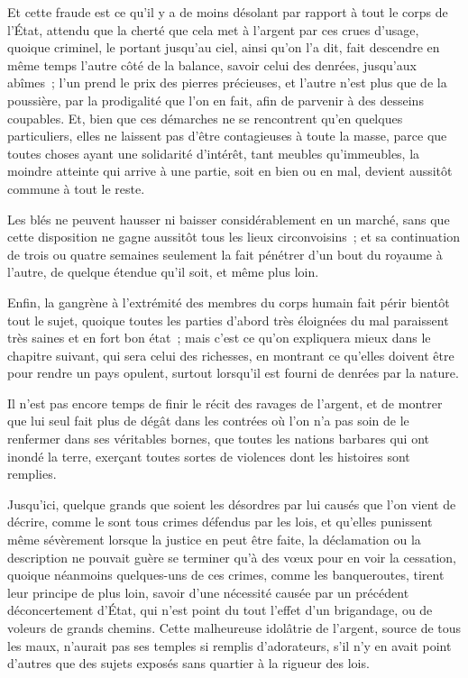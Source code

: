 \documentclass[french,twoside]{book} %
\begin{document}
Et cette fraude est ce qu’il y a de moins désolant par rapport à tout le corps de l’État, attendu que la cherté que cela met à l’argent par ces crues d’usage, quoique criminel, le portant jusqu’au ciel, ainsi qu’on l’a dit, fait descendre en même temps l’autre côté de la balance, savoir celui des denrées, jusqu’aux abîmes ; l’un prend le prix des pierres précieuses, et l’autre n’est plus que de la poussière, par la prodigalité que l’on en fait, afin de parvenir à des desseins coupables. Et, bien que ces démarches ne se rencontrent qu’en quelques particuliers, elles ne laissent pas d’être contagieuses à toute la masse, parce que toutes choses ayant une solidarité d’intérêt, tant meubles qu’immeubles, la moindre atteinte qui arrive à une partie, soit en bien ou en mal, devient aussitôt commune à tout le reste.\par
Les blés ne peuvent hausser ni baisser considérablement en un marché, sans que cette disposition ne gagne aussitôt tous les lieux circonvoisins ; et sa continuation de trois ou quatre semaines seulement la fait pénétrer d’un bout du royaume à l’autre, de quelque étendue qu’il soit, et même plus loin.\par
Enfin, la gangrène à l’extrémité des membres du corps humain fait périr bientôt tout le sujet, quoique toutes les parties d’abord très éloignées du mal paraissent très saines et en fort bon état ; mais c’est ce qu’on expliquera mieux dans le chapitre suivant, qui sera celui des richesses, en montrant ce qu’elles doivent être pour rendre un pays opulent, surtout lorsqu’il est fourni de denrées par la nature.\par
Il n’est pas encore temps de finir le récit des ravages de l’argent, et de montrer que lui seul fait plus de dégât dans les contrées où l’on n’a pas soin de le renfermer dans ses véritables bornes, que toutes les nations barbares qui ont inondé la terre, exerçant toutes sortes de violences dont les histoires sont remplies.\par
Jusqu’ici, quelque grands que soient les désordres par lui causés que l’on vient de décrire, comme le sont tous crimes défendus par les lois, et qu’elles punissent même sévèrement lorsque la justice en peut être faite, la déclamation ou la description ne pouvait guère se terminer qu’à des vœux pour en voir la cessation, quoique néanmoins quelques-uns de ces crimes, comme les banqueroutes, tirent leur principe de plus loin, savoir d’une nécessité causée par un précédent déconcertement d’État, qui n’est point du tout l’effet d’un brigandage, ou de voleurs de grands chemins. Cette malheureuse idolâtrie de l’argent, source de tous les maux, n’aurait pas ses temples si remplis d’adorateurs, s’il n’y en avait point d’autres que des sujets exposés sans quartier à la rigueur des lois.\par
\end{document}
